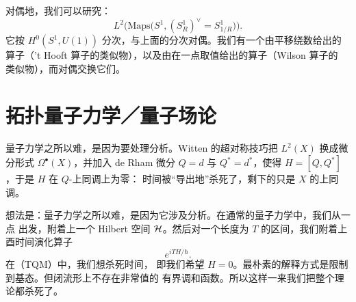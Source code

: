 对偶地，我们可以研究：
\begin{equation}\tag{4.56}
L^{2}\bigl(\mathrm{Maps}\bigl(S^{1},(S^{1}_{R})^{\vee}=S^{1}_{1/R}\bigr)\bigr).
\end{equation}
它按 $H^{0}(S^{1},U(1))$ 分次，与上面的分次对偶。我们有一个由平移绕数给出的
算子（'t Hooft 算子的类似物），以及由在一点取值给出的算子（Wilson 算子的
类似物），而对偶交换它们。


\section{拓扑量子力学／量子场论}
\begin{sectionkey}
量子力学之所以难，是因为要处理分析。Witten 的超对称技巧把
$L^{2}(X)$ 换成微分形式 $\Omega^{\bullet}(X)$，并加入 de Rham 微分 $Q=d$ 与
$Q^{*}=d^{*}$，使得 $H=[Q,Q^{*}]$，于是 $H$ 在 $Q$-上同调上为零：
时间被“导出地”杀死了，剩下的只是 $X$ 的上同调。
\end{sectionkey}

想法是：量子力学之所以难，是因为它涉及分析。在通常的量子力学中，我们从一点
出发，附着上一个 Hilbert 空间 $\mathcal{H}$。然后对一个长度为 $T$ 的区间，我们附着上
酉时间演化算子
\begin{equation}\tag{4.57}
e^{iTH/\hbar}.
\end{equation}
在（TQM）中，我们想杀死时间，
即我们希望 $H=0$。最朴素的解释方式是限制到基态。但闭流形上不存在非常值的
有界调和函数。所以这样一来我们把整个理论都杀死了。

